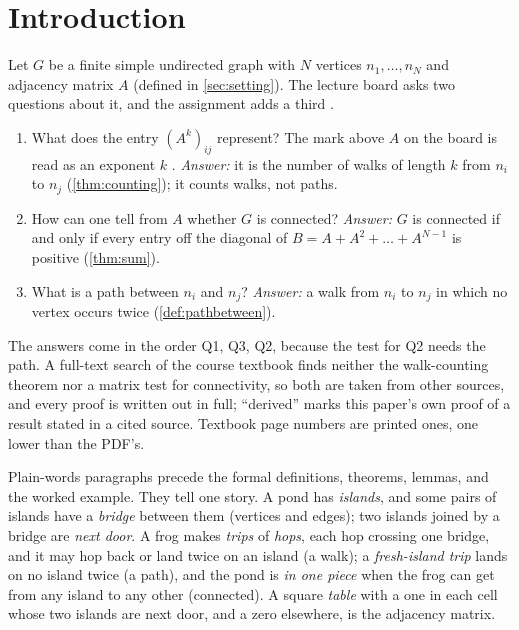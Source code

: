 \section{Introduction}

Let $G$ be a finite simple undirected graph with $N$ vertices $n_1,\dots,n_N$
and adjacency matrix $A$ (defined in \cref{sec:setting}). The lecture board
asks two questions about it, and the assignment adds a third
\cite{whiteboard1,whiteboard2,userstatements}.
\begin{enumerate}
\item[(Q1)] What does the entry $(A^k)_{ij}$ represent? The mark above $A$ on
  the board is read as an exponent $k$ \cite{userstatements}.
  \emph{Answer:} it is the number of walks of length $k$ from $n_i$ to $n_j$
  (\cref{thm:counting}); it counts walks, not paths.
\item[(Q2)] How can one tell from $A$ whether $G$ is connected?
  \emph{Answer:} $G$ is connected if and only if every entry off the
  diagonal of $B=A+A^2+\dots+A^{N-1}$ is positive (\cref{thm:sum}).
\item[(Q3)] What is a path between $n_i$ and $n_j$? \emph{Answer:} a walk
  from $n_i$ to $n_j$ in which no vertex occurs twice
  (\cref{def:pathbetween}).
\end{enumerate}
The answers come in the order Q1, Q3, Q2, because the test for Q2 needs the path. A full-text search of the course textbook
\cite{petrosyan2015graphs} finds neither the walk-counting theorem nor a matrix test for
connectivity, so both are taken from other sources, and every proof is written out in
full; ``derived'' marks this paper's own proof of a result stated in a cited source.
Textbook page numbers are printed ones, one lower than the PDF's.

Plain-words paragraphs precede the formal definitions, theorems, lemmas, and the worked example. They tell one story. A pond has \emph{islands}, and some pairs of islands have a \emph{bridge} between them (vertices and edges); two islands joined by a bridge are \emph{next door}. A frog makes \emph{trips} of \emph{hops}, each hop crossing one bridge, and it may hop back or land twice on an island (a walk); a \emph{fresh-island trip} lands on no island twice (a path), and the pond is \emph{in one piece} when the frog can get from any island to any other (connected). A square \emph{table} with a one in each cell whose two islands are next door, and a zero elsewhere, is the adjacency matrix.
